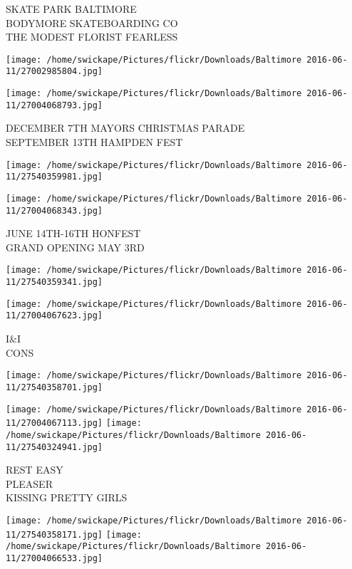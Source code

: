 \documentclass[10pt,letterpaper]{article}
\begin{document}
SKATE PARK BALTIMORE\\
BODYMORE SKATEBOARDING CO\\
THE MODEST FLORIST FEARLESS
\pagebreak

\texttt{[image: /home/swickape/Pictures/flickr/Downloads/Baltimore 2016-06-11/27002985804.jpg]}

\vspace{0.25in}
\texttt{[image: /home/swickape/Pictures/flickr/Downloads/Baltimore 2016-06-11/27004068793.jpg]}

DECEMBER 7TH MAYORS CHRISTMAS PARADE\\
SEPTEMBER 13TH HAMPDEN FEST
\pagebreak

\texttt{[image: /home/swickape/Pictures/flickr/Downloads/Baltimore 2016-06-11/27540359981.jpg]}

\vspace{0.25in}
\texttt{[image: /home/swickape/Pictures/flickr/Downloads/Baltimore 2016-06-11/27004068343.jpg]}

JUNE 14TH{-}16TH HONFEST\\
GRAND OPENING MAY 3RD
\pagebreak

\texttt{[image: /home/swickape/Pictures/flickr/Downloads/Baltimore 2016-06-11/27540359341.jpg]}

\vspace{0.25in}
\texttt{[image: /home/swickape/Pictures/flickr/Downloads/Baltimore 2016-06-11/27004067623.jpg]}

I\&I\\
CONS
\pagebreak

\texttt{[image: /home/swickape/Pictures/flickr/Downloads/Baltimore 2016-06-11/27540358701.jpg]}

\vspace{0.25in}
\texttt{[image: /home/swickape/Pictures/flickr/Downloads/Baltimore 2016-06-11/27004067113.jpg]}
\texttt{[image: /home/swickape/Pictures/flickr/Downloads/Baltimore 2016-06-11/27540324941.jpg]}

REST EASY\\
PLEASER\\
KISSING PRETTY GIRLS
\pagebreak

\texttt{[image: /home/swickape/Pictures/flickr/Downloads/Baltimore 2016-06-11/27540358171.jpg]}
\texttt{[image: /home/swickape/Pictures/flickr/Downloads/Baltimore 2016-06-11/27004066533.jpg]}
\end{document}
